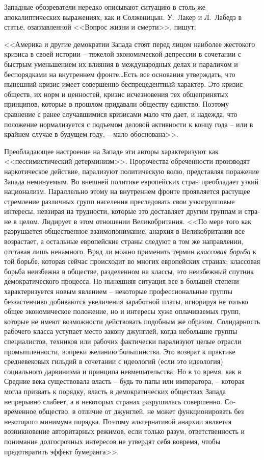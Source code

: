 \documentclass{book}
\begin{document}
Западные обозреватели нередко описывают ситуацию в столь же апокалиптических выражениях, как и Солженицын. У.~Лакер и Л.~Лабедз в статье, озаглавленной <<Вопрос жизни и смерти>>, пишут:

<<Америка и другие демократии Запада стоят перед лицом наиболее жестокого кризиса в своей истории -- тяжелой эконо­мической депрессии в сочетании с быстрым уменьшением их влияния в международных делах и параличом и беспорядками на внутреннем фронте\ldots Есть все основания утверждать, что нынешний кризис имеет совершенно беспрецедентный харак­тер. Это кризис обществ, их норм и ценностей, кризис исчез­новения тех общепринятых принципов, которые в прошлом придавали обществу единство. Поэтому сравнение с ранее слу­чавшимися кризисами мало что дает, и надежда, что положе­ние нормализуется с подъемом деловой активности к концу года -- или в крайнем случае в будущем году, -- мало обосно­вана>>.%

Преобладающее настроение на Западе эти авторы характе­ризуют как <<пессимистический детерминизм>>. Пророчества обреченности производят наркотическое действие, парализуют политическую волю, представляя поражение Запада немину­емым. Во внешней политике европейских стран преобладает узкий национализм. Параллельно этому на внутреннем фрон­те проявляется растущее стремление различных групп населе­ния преследовать свои узкогрупповые интересы, невзирая на трудности, которые это доставляет другим группам и стра­не в целом. Лидирует в этом отношении Великобритания. <<По мере того как разрушается общественное взаимопонимание, анархия в Великобритании все возрастает, а остальные евро­пейские страны следуют в том же направлении, отставая лишь ненамного. Вряд ли можно применить термин \textit{классовая борьба} к  той борьбе, которая сейчас происходит во многих евро­пейских странах; классовая борьба неизбежна в обществе, раз­деленном на классы, это неизбежный спутник демократиче­ского процесса. Но нынешняя ситуация все в 
большей 
степени характеризуется новым явлением -- некоторые професси­ональные группы беззастенчиво добиваются увеличения зара­ботной платы, игнорируя не только общее экономическое положение, но и интересы хуже оплачиваемых групп, которые не имеют возможности действовать подобным же образом. Солидарность рабочего класса уступает место закону джунг­лей, когда небольшие группы специалистов, техников или ра­бочих фактически парализуют целые отрасли промышленно­сти, вопреки желанию большинства. Это возврат к практике средневековых гильдий в сочетании с идеологий (если это идеология) социального дарвинизма и принципа невмешатель­ства. Но в то время, как в Средние века существовала власть -- будь то папы или императора, -- которая могла призвать к поряд­ку, власть в демократических обществах Запада непрерывно слабеет, а в некоторых странах разрушилась совершенно. Со­временное общество, в отличие от джунглей, не может функ­ционировать без некоторого минимума порядка. Поэтому альтернативой анархии является возникновение 
авторитарных режимов, если только разум, ответственность и понимание долгосрочных интересов не утвердят себя вовремя, чтобы предотвратить эффект бумеранга>>.%
\end{document}
